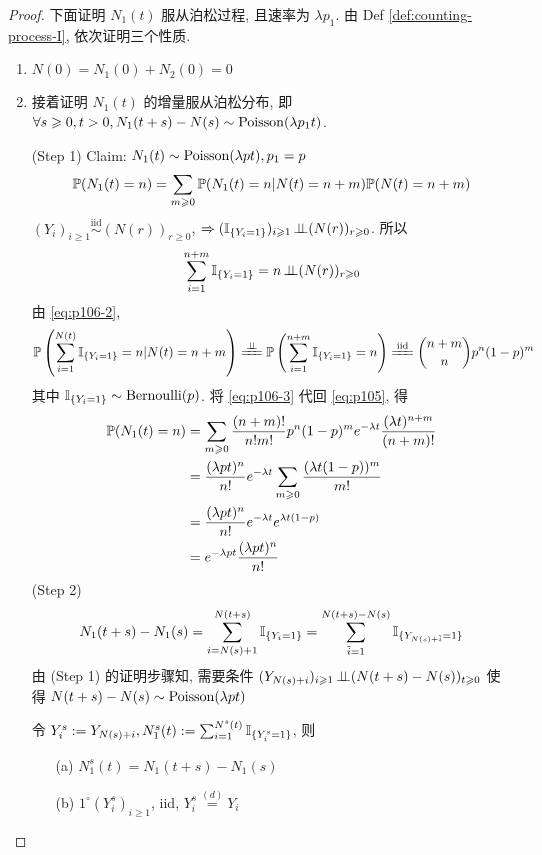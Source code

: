 \begin{proof}
下面证明 $N_1(t)$ 服从泊松过程, 且速率为 $\lambda p_1$. 由 Def \ref{def:counting-process-I}, 依次证明三个性质.
\begin{enumerate}
    \item $N(0)=N_1(0)+N_2(0)=0$
    \item 接着证明 $N_1(t)$ 的增量服从泊松分布, 即 $\forall s\geqslant 0,t>0, N_1(t+s)-N(s)\sim \operatorname{Poisson}(\lambda p_1 t)$.
    
    (Step 1) Claim: $N_1(t)\sim\operatorname{Poisson}(\lambda pt),p_1=p$
    \begin{equation}
        \mathbb{P}(N_1(t)=n)=\sum_{m\geqslant 0}\mathbb{P}(N_1(t)=n|N(t)=n+m)\mathbb{P}(N(t)=n+m)
        \label{eq:p105}
    \end{equation}
    $(Y_i)_{i\geq 1}\overset{\text{iid}}{\sim}(N(r))_{r\geq 0}$, $\Rightarrow (\mathbb I_{\{Y_i=1\}})_{i\geqslant 1}\operatorname{\perp\!\!\!\perp} (N(r))_{r\geqslant 0}$. 所以
    \begin{equation}
        \sum_{i=1}^{n+m}\mathbb I_{\{Y_i=1\}}=n\operatorname{\perp\!\!\!\perp} (N(r))_{r\geqslant 0}
        \label{eq:p106-2}
    \end{equation}
    由 \eqref{eq:p106-2},
    \begin{equation}
        \PP\left(\sum_{i=1}^{N(t)}\II_{\{Y_i=1\}}=n|N(t)=n+m\right)\xlongequal{\ind}\PP\left(\sum_{i=1}^{n+m}\II_{\{Y_i=1\}}=n\right)\xlongequal{\text{iid}}\binom{n+m}{n}p^n(1-p)^m
        \label{eq:p106-3}
    \end{equation}
    其中 $\mathbb I_{\{Y_i=1\}}\sim\operatorname{Bernoulli}(p)$. 将 \eqref{eq:p106-3} 代回 \eqref{eq:p105}, 得
    \[
    \begin{aligned}
        \mathbb{P}(N_1(t)=n) &=\sum_{m\geqslant 0}\frac{(n+m)!}{n!m!}p^n(1-p)^m e^{-\lambda t}\frac{(\lambda t)^{n+m}}{(n+m)!}\\
        &=\frac{(\lambda pt)^n}{n!}e^{-\lambda t}\sum_{m\geqslant 0}\frac{(\lambda t(1-p))^m}{m!}\\
        &=\frac{(\lambda pt)^n}{n!}e^{-\lambda t}e^{\lambda t(1-p)}\\
        &=e^{-\lambda pt}\frac{(\lambda pt)^n}{n!}
    \end{aligned}
    \]
    (Step 2)
    \[
    N_1(t+s)-N_1(s)=\sum_{i=N(s)+1}^{N(t+s)}\mathbb I_{\{Y_i=1\}}=\sum_{\tilde{i}=1}^{N(t+s)-N(s)}\mathbb I_{\{Y_{N(s)+\tilde{i}}=1\}}
    \]
    由 (Step 1) 的证明步骤知, 需要条件 $(Y_{N(s)+i})_{i\geqslant 1}\operatorname{\perp\!\!\!\perp} (N(t+s)-N(s))_{t\geqslant 0}$ 使得 $N(t+s)-N(s)\sim \operatorname{Poisson}(\lambda pt)$
    \begin{lemma}\label{lem:p106}
        令 $Y_i^s:=Y_{N(s)+i}, N_1^s(t):=\sum_{i=1}^{N^s(t)}\mathbb I_{\{Y_i^s=1\}}$, 则
        \begin{enumerate}
            \item[(a)] $N_1^s(t)=N_1(t+s)-N_1(s)$
            \item[(b)] $1^{\circ} (Y_i^s)_{i\geq 1}$, iid, $Y_i^s\overset{(d)}{=}Y_i$
            

\end{enumerate}
\end{lemma}
\end{enumerate}
\end{proof}
